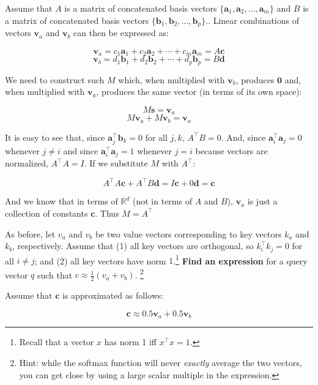 \begin{parts}
\begin{subparts}
\begin{answer}
        Assume that $A$ is a matrix of concatenated basis vectors $\{\mathbf{a}_1, \mathbf{a}_2, \ldots, \mathbf{a}_m\}$ and $B$ is a matrix of concatenated basis vectors $\{\mathbf{b}_1, \mathbf{b}_2, \ldots, \mathbf{b}_p\}.$. Linear combinations of vectors $\mathbf{v}_a$ and $\mathbf{v}_b$ can then be expressed as:
        
        $$\mathbf{v}_a = c_1 \mathbf{a}_1 + c_2 \mathbf{a}_2 + \cdots + c_m \mathbf{a}_m=A\mathbf{c}$$
        $$\mathbf{v}_b = d_1 \mathbf{b}_1 + d_2 \mathbf{b}_2 + \cdots + d_p \mathbf{b}_p=B\mathbf{d}$$
        
        We need to construct such $M$ which, when multiplied with $\mathbf{v}_b$, produces $\mathbf{0}$ and, when multiplied with $\mathbf{v}_a$, produces the same vector (in terms of its own space):
        
        $$M\mathbf{s}=\mathbf{v}_a$$
        $$M\mathbf{v}_a + M\mathbf{v}_b=\mathbf{v}_a$$
        
        It is easy to see that, since $\mathbf{a}_j^{\top}\mathbf{b}_{k}=0$ for all $j,k$, $A^{\top}B=0$. And, since $\mathbf{a}_i^{\top}\mathbf{a}_{j}=0$ whenever $j\ne i$ and since $\mathbf{a}_i^{\top}\mathbf{a}_{j}=1$ whenever $j=i$ because vectors are normalized, $A^{\top}A=I$. If we substitute $M$ with $A^{\top}$:
        
        $$A^{\top}A\mathbf{c}+A^{\top}B\mathbf{d}=I\mathbf{c}+0\mathbf{d}=\mathbf{c}$$
        
        And we know that in terms of $\mathbb{R}^{d}$ (not in terms of $A$ and $B$), $\mathbf{v}_a$ is just a collection of constants $\mathbf{c}$. Thus $M=A^{\top}$
\end{answer}

\subpart[4] As before, let $v_a$ and $v_b$ be two value vectors corresponding to key vectors $k_a$ and $k_b$, respectively.
Assume that (1) all key vectors are orthogonal, so $k_i^\top k_j = 0$ for all $i \neq j$; and (2) all key vectors have norm $1$.\footnote{Recall that a vector $x$ has norm 1 iff $x^\top x = 1$.}
\textbf{Find an expression} for a query vector $q$ such that $c \approx \frac{1}{2}(v_a + v_b)$. \footnote{Hint: while the softmax function will never \textit{exactly} average the two vectors, you can get close by using a large scalar multiple in the expression.} 
\begin{answer}
    Assume that $\mathbf{c}$ is approximated as follows:
    
    $$\mathbf{c}\approx 0.5 \mathbf{v}_a + 0.5 \mathbf{v}_b$$
    

\end{answer}
\end{subparts}
\end{parts}
